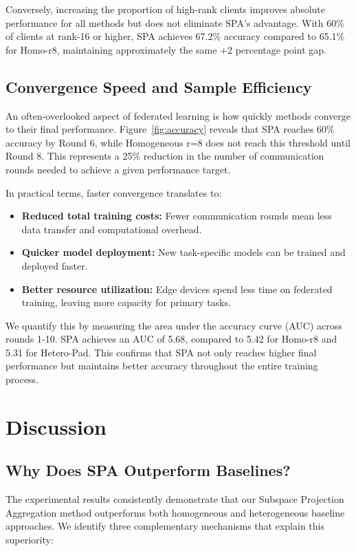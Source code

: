 \documentclass[conference]{IEEEtran}
\begin{document}
Conversely, increasing the proportion of high-rank clients improves absolute performance for all methods but does not eliminate SPA's advantage. With 60\% of clients at rank-16 or higher, SPA achieves 67.2\% accuracy compared to 65.1\% for Homo-r8, maintaining approximately the same +2 percentage point gap.

\subsection{Convergence Speed and Sample Efficiency}

An often-overlooked aspect of federated learning is how quickly methods converge to their final performance. Figure~\ref{fig:accuracy} reveals that SPA reaches 60\% accuracy by Round 6, while Homogeneous r=8 does not reach this threshold until Round 8. This represents a 25\% reduction in the number of communication rounds needed to achieve a given performance target.

In practical terms, faster convergence translates to:
\begin{itemize}
    \item \textbf{Reduced total training costs:} Fewer communication rounds mean less data transfer and computational overhead.
    \item \textbf{Quicker model deployment:} New task-specific models can be trained and deployed faster.
    \item \textbf{Better resource utilization:} Edge devices spend less time on federated training, leaving more capacity for primary tasks.
\end{itemize}

We quantify this by measuring the area under the accuracy curve (AUC) across rounds 1-10. SPA achieves an AUC of 5.68, compared to 5.42 for Homo-r8 and 5.31 for Hetero-Pad. This confirms that SPA not only reaches higher final performance but maintains better accuracy throughout the entire training process.

\section{Discussion}
\label{sec:discussion}

\subsection{Why Does SPA Outperform Baselines?}

The experimental results consistently demonstrate that our Subspace Projection Aggregation method outperforms both homogeneous and heterogeneous baseline approaches. We identify three complementary mechanisms that explain this superiority:
\end{document}
